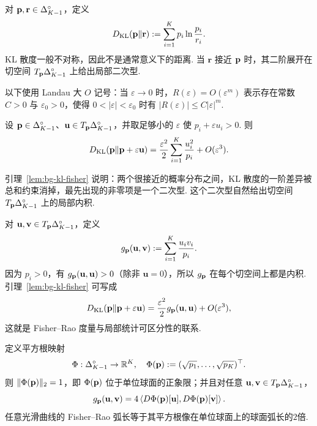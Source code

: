 \begin{definition}[KL 散度]\label{def:bg-kl}
对 $\mathbf p,\mathbf r\in\Delta_{K-1}^{\circ}$，定义
\[
D_{\mathrm{KL}}(\mathbf p\|\mathbf r)
:=\sum_{i=1}^{K}p_i\ln\frac{p_i}{r_i}.
\]
KL 散度一般不对称，因此不是通常意义下的距离. 当 $\mathbf r$ 接近 $\mathbf p$ 时，其二阶展开在切空间 $T_{\mathbf p}\Delta_{K-1}^{\circ}$ 上给出局部二次型. 
\end{definition}

以下使用 Landau 大 $O$ 记号：当 $\varepsilon\to0$ 时，$R(\varepsilon)=O(\varepsilon^m)$ 表示存在常数 $C>0$ 与 $\varepsilon_0>0$，使得 $0<|\varepsilon|<\varepsilon_0$ 时有 $|R(\varepsilon)|\le C|\varepsilon|^m$. 

\begin{lemma}[KL 散度的局部二阶展开]\label{lem:bg-kl-fisher}
设 $\mathbf p\in\Delta_{K-1}^{\circ}$、$\mathbf u\in T_{\mathbf p}\Delta_{K-1}^{\circ}$，并取足够小的 $\varepsilon$ 使 $p_i+\varepsilon u_i>0$. 则
\begin{equation}\label{eq:bg-kl-taylor}
D_{\mathrm{KL}}(\mathbf p\|\mathbf p+\varepsilon\mathbf u)
=\frac{\varepsilon^2}{2}\sum_{i=1}^{K}\frac{u_i^2}{p_i}+O(\varepsilon^3).
\end{equation}
\end{lemma}

引理~\ref{lem:bg-kl-fisher} 说明：两个很接近的概率分布之间，KL 散度的一阶差异被总和约束消掉，最先出现的非零项是一个二次型. 这个二次型自然给出切空间 $T_{\mathbf p}\Delta_{K-1}^{\circ}$ 上的局部内积. 

\begin{definition}\label{def:bg-fisher}
对 $\mathbf u,\mathbf v\in T_{\mathbf p}\Delta_{K-1}^{\circ}$，定义
\begin{equation}\label{eq:bg-fisher}
g_{\mathbf p}(\mathbf u,\mathbf v)
:=\sum_{i=1}^{K}\frac{u_iv_i}{p_i}.
\end{equation}
因为 $p_i>0$，有 $g_{\mathbf p}(\mathbf u,\mathbf u)>0$（除非 $\mathbf u=0$），所以 $g_{\mathbf p}$ 在每个切空间上都是内积. 引理~\ref{lem:bg-kl-fisher} 可写成
\[
D_{\mathrm{KL}}(\mathbf p\|\mathbf p+\varepsilon\mathbf u)
=\frac{\varepsilon^2}{2}g_{\mathbf p}(\mathbf u,\mathbf u)+O(\varepsilon^3),
\]
这就是 Fisher--Rao 度量与局部统计可区分性的联系\cite{amari2016,pistone}. 
\end{definition}

\begin{theorem}\label{thm:bg-sqrt-isometry}
定义平方根映射
\[
\Phi:\Delta_{K-1}^{\circ}\to\mathbb R^K,
\quad
\Phi(\mathbf p):=(\sqrt{p_1},\ldots,\sqrt{p_K})^\top.
\]
则 $\|\Phi(\mathbf p)\|_2=1$，即 $\Phi(\mathbf p)$ 位于单位球面的正象限；并且对任意 $\mathbf u,\mathbf v\in T_{\mathbf p}\Delta_{K-1}^{\circ}$，
\begin{equation}\label{eq:bg-sqrt-isometry}
g_{\mathbf p}(\mathbf u,\mathbf v)
=4\left\langle D\Phi(\mathbf p)[\mathbf u],D\Phi(\mathbf p)[\mathbf v]\right\rangle .
\end{equation}
任意光滑曲线的 Fisher--Rao 弧长等于其平方根像在单位球面上的球面弧长的$2$倍.
\end{theorem}

